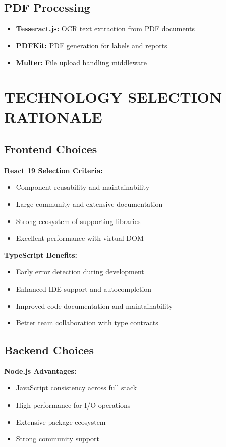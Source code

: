 \subsection{PDF Processing}

\begin{itemize}
\item \textbf{Tesseract.js:} OCR text extraction from PDF documents
\item \textbf{PDFKit:} PDF generation for labels and reports
\item \textbf{Multer:} File upload handling middleware
\end{itemize}

\section{TECHNOLOGY SELECTION RATIONALE}

\subsection{Frontend Choices}

\textbf{React 19 Selection Criteria:}
\begin{itemize}
\item Component reusability and maintainability
\item Large community and extensive documentation
\item Strong ecosystem of supporting libraries
\item Excellent performance with virtual DOM
\end{itemize}

\textbf{TypeScript Benefits:}
\begin{itemize}
\item Early error detection during development
\item Enhanced IDE support and autocompletion
\item Improved code documentation and maintainability
\item Better team collaboration with type contracts
\end{itemize}

\subsection{Backend Choices}

\textbf{Node.js Advantages:}
\begin{itemize}
\item JavaScript consistency across full stack
\item High performance for I/O operations
\item Extensive package ecosystem
\item Strong community support
\end{itemize}

